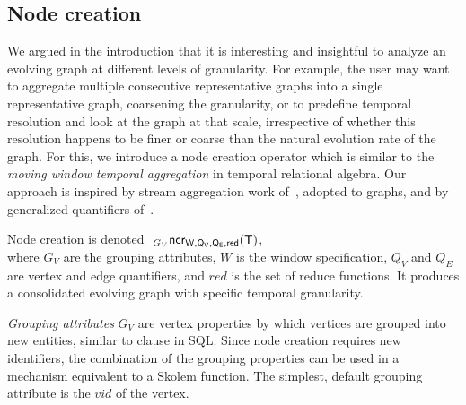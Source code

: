 
\subsection{Node creation}
\label{sec:algebra:ncreate}

We argued in the introduction that it is interesting and insightful to
analyze an evolving graph at different levels of granularity.  For
example, the user may want to aggregate multiple consecutive
representative graphs into a single representative graph, coarsening
the granularity, or to predefine temporal resolution and look at the
graph at that scale, irrespective of whether this resolution happens
to be finer or coarse than the natural evolution rate of the graph.
For this, we introduce a node creation operator which is similar to
the {\em moving window temporal aggregation} in temporal relational
algebra.  Our approach is inspired by stream aggregation work
of~\cite{Li2005}, adopted to graphs, and by generalized quantifiers
of~\cite{Hsu1995}.

Node creation is denoted $~_{G_V}\textsf{ncr}_{\mathsf{W,Q_V,Q_E,red}}(\mathsf{T})$,\\ where
$G_V$ are the grouping attributes, $W$ is the window specification,
$Q_V$ and $Q_E$ are vertex and edge quantifiers, and $red$ is the set
of reduce functions.  It produces a consolidated evolving graph with
specific temporal granularity.

{\em Grouping attributes} $G_V$ are vertex properties by which
vertices are grouped into new entities, similar to 
clause in SQL.  Since node creation requires new identifiers, the
combination of the grouping properties can be used in a mechanism
equivalent to a Skolem function.  The simplest, default grouping
attribute is the $vid$ of the vertex.

